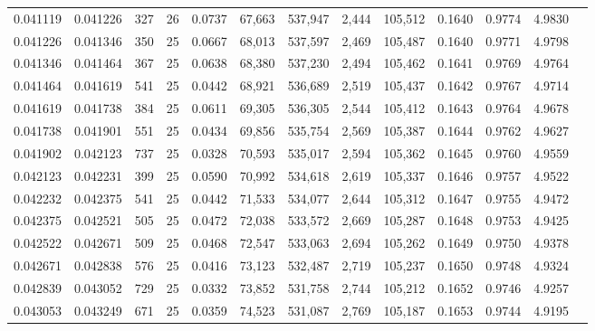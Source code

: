 \begin{tabular}{rrrrrrrrrrrrr}
0.041119 & 0.041226 &   327 &  26 &                                     0.0737 &  67,663 & 537,947 &   2,444 & 105,512 & 0.1640 & 0.9774 & 4.9830 \\
0.041226 & 0.041346 &   350 &  25 &                                     0.0667 &  68,013 & 537,597 &   2,469 & 105,487 & 0.1640 & 0.9771 & 4.9798 \\
0.041346 & 0.041464 &   367 &  25 &                                     0.0638 &  68,380 & 537,230 &   2,494 & 105,462 & 0.1641 & 0.9769 & 4.9764 \\
0.041464 & 0.041619 &   541 &  25 &                                     0.0442 &  68,921 & 536,689 &   2,519 & 105,437 & 0.1642 & 0.9767 & 4.9714 \\
0.041619 & 0.041738 &   384 &  25 &                                     0.0611 &  69,305 & 536,305 &   2,544 & 105,412 & 0.1643 & 0.9764 & 4.9678 \\
0.041738 & 0.041901 &   551 &  25 &                                     0.0434 &  69,856 & 535,754 &   2,569 & 105,387 & 0.1644 & 0.9762 & 4.9627 \\
0.041902 & 0.042123 &   737 &  25 &                                     0.0328 &  70,593 & 535,017 &   2,594 & 105,362 & 0.1645 & 0.9760 & 4.9559 \\
0.042123 & 0.042231 &   399 &  25 &                                     0.0590 &  70,992 & 534,618 &   2,619 & 105,337 & 0.1646 & 0.9757 & 4.9522 \\
0.042232 & 0.042375 &   541 &  25 &                                     0.0442 &  71,533 & 534,077 &   2,644 & 105,312 & 0.1647 & 0.9755 & 4.9472 \\
0.042375 & 0.042521 &   505 &  25 &                                     0.0472 &  72,038 & 533,572 &   2,669 & 105,287 & 0.1648 & 0.9753 & 4.9425 \\
0.042522 & 0.042671 &   509 &  25 &                                     0.0468 &  72,547 & 533,063 &   2,694 & 105,262 & 0.1649 & 0.9750 & 4.9378 \\
0.042671 & 0.042838 &   576 &  25 &                                     0.0416 &  73,123 & 532,487 &   2,719 & 105,237 & 0.1650 & 0.9748 & 4.9324 \\
0.042839 & 0.043052 &   729 &  25 &                                     0.0332 &  73,852 & 531,758 &   2,744 & 105,212 & 0.1652 & 0.9746 & 4.9257 \\
0.043053 & 0.043249 &   671 &  25 &                                     0.0359 &  74,523 & 531,087 &   2,769 & 105,187 & 0.1653 & 0.9744 & 4.9195 \\

\end{tabular}
